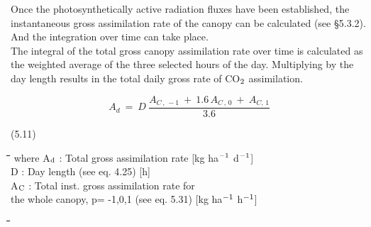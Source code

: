 Once the photosynthetically active radiation fluxes have been established, the instanta\-neous gross assimilation rate of the canopy can be calculated (see \S 5.3.2). And the
integration over time can take place.\\
The integral of the total gross canopy assimilation rate over time is calculated as the
weighted average of the three selected hours of the day. Multiply\-ing by the day length
results in the total daily gross rate of CO$_{{\rm 2}}$ assimilation. 

\begin{displaymath}
A _{d} ~=~D~{\frac{A _{C\, ,\, -1} ~+~ 1.6\, A _{C\, ,\, 0} ~+~ A _{C,\, 1} }{3.6}}
\end{displaymath}


\strut\hfill (5.11)
\nwln
\begin{tabbing}
\hspace{1.27cm}\=\hspace{1.27cm}\=\hspace{1.27cm}\=\hspace{1.27cm}\=%
\hspace{1.27cm}\=\hspace{1.27cm}\=\hspace{1.27cm}\=\hspace{1.27cm}\=%
\hspace{1.27cm}\=\hspace{1.27cm}\=\kill
where A$_{{\rm d}}$ : Total gross assimilation rate        [kg ha$^{{\rm -1}}$ d$^{{\rm -1}}$]\\
D : Day length (see eq. 4.25)        [h]\\
A$_{{\rm C}}$ : Total inst. gross assimila\-tion rate for\\
   the whole canopy, p= -1,0,1 (see eq. 5.31)        [kg ha$^{{\rm -1}}$ h$^{{\rm -1}}$]\\
   
\end{tabbing}

\nwln
\begin{tabbing}
\hspace{1.27cm}\=\hspace{1.27cm}\=\hspace{1.27cm}\=\hspace{1.27cm}\=%
\hspace{1.27cm}\=\hspace{1.27cm}\=\hspace{1.27cm}\=\hspace{1.27cm}\=%
\hspace{1.27cm}\=\hspace{1.27cm}\=\kill
 
\end{tabbing}

